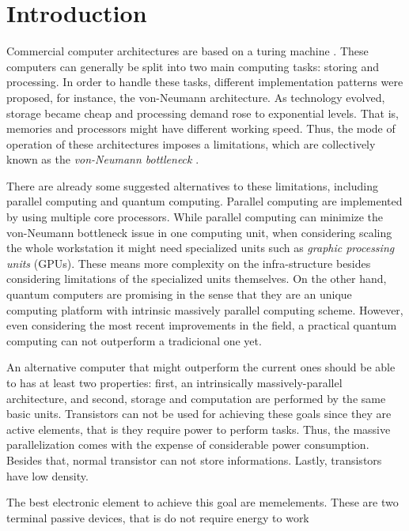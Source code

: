\section{Introduction}
\label{sec:intro}

Commercial computer architectures are based on a turing machine \citep{turing}.
These computers can generally be split into two main computing tasks: storing and processing.
In order to handle these tasks, different implementation patterns were proposed, for instance, the von-Neumann architecture.
As technology evolved, storage became cheap and processing demand rose to exponential levels.
That is, memories and processors might have different working speed.
Thus, the mode of operation of these architectures imposes a limitations, which are collectively known as the \emph{von-Neumann bottleneck} \citep{bottleneck}. 

There are already some suggested alternatives to these limitations, including parallel computing and quantum computing.
Parallel computing are implemented by using multiple core processors.
While parallel computing can minimize the von-Neumann bottleneck issue in one computing unit, when considering scaling the whole workstation it might need specialized units such as \emph{graphic processing units} (GPUs).
These means more complexity on the infra-structure besides considering limitations of the specialized units themselves.
On the other hand, quantum computers are promising in the sense that they are an unique computing platform with intrinsic massively parallel computing scheme.
However, even considering the most recent improvements in the field, a practical quantum computing can not outperform a tradicional one yet.

An alternative computer that might outperform the current ones should be able to has at least two properties: first, an intrinsically massively-parallel architecture, and second, storage and computation are performed by the same basic units.
Transistors can not be used for achieving these goals since they are active elements, that is they require power to perform tasks.
Thus, the massive parallelization comes with the expense of considerable power consumption.
Besides that, normal transistor can not store informations.
Lastly, transistors have low density.

The best electronic element to achieve this goal are memelements.
These are two terminal passive devices, that is do not require energy to work